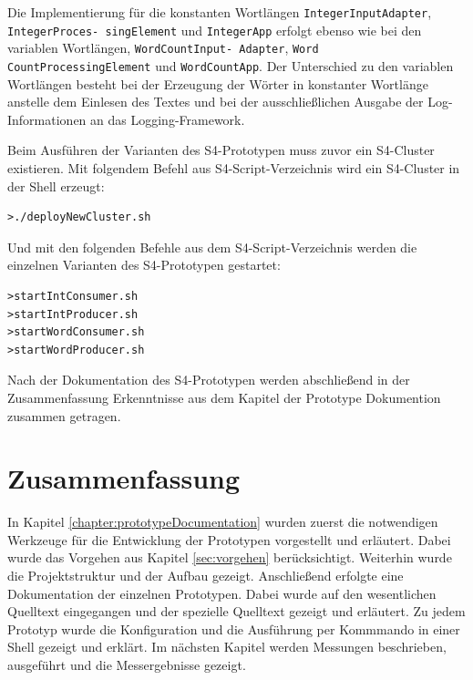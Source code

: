 

Die Implementierung für die konstanten Wortlängen \texttt{IntegerInputAdapter}, \texttt{IntegerProces- singElement} und \texttt{IntegerApp} erfolgt ebenso wie bei den variablen Wortlängen, \texttt{WordCountInput- Adapter}, \texttt{Word CountProcessingElement} und \texttt{WordCountApp}. Der Unterschied zu den variablen Wortlängen besteht bei der Erzeugung der Wörter in konstanter Wortlänge anstelle dem Einlesen des Textes und bei der ausschließlichen Ausgabe der Log-Informationen an das Logging-Framework.

Beim Ausführen der Varianten des S4-Prototypen muss zuvor ein S4-Cluster existieren. Mit folgendem Befehl aus S4-Script-Verzeichnis wird ein S4-Cluster in der Shell erzeugt:

\begin{verbatim}
>./deployNewCluster.sh
\end{verbatim}

Und mit den folgenden Befehle aus dem S4-Script-Verzeichnis werden die einzelnen Varianten des S4-Prototypen gestartet:

\begin{verbatim}
>startIntConsumer.sh
>startIntProducer.sh
>startWordConsumer.sh
>startWordProducer.sh
\end{verbatim}

Nach der Dokumentation des S4-Prototypen werden abschließend in der Zusammenfassung Erkenntnisse aus dem Kapitel der Prototype Dokumention zusammen getragen.


\section{Zusammenfassung}

In Kapitel \ref{chapter:prototypeDocumentation} wurden zuerst die notwendigen Werkzeuge für die Entwicklung der Prototypen vorgestellt und erläutert. Dabei wurde das Vorgehen aus Kapitel \ref{sec:vorgehen} berücksichtigt. Weiterhin wurde die Projektstruktur und der Aufbau gezeigt. Anschließend erfolgte eine Dokumentation der einzelnen Prototypen. Dabei wurde auf den wesentlichen Quelltext eingegangen und der spezielle Quelltext gezeigt und erläutert. Zu jedem Prototyp wurde die Konfiguration und die Ausführung per Kommmando in einer Shell gezeigt und erklärt. Im nächsten Kapitel werden Messungen beschrieben, ausgeführt und die Messergebnisse gezeigt.